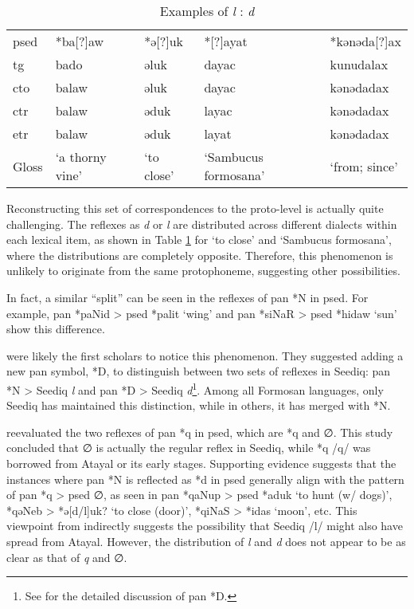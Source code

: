 \begin{table}[!htbp]
\centering
\caption{Examples of \textit{l} : \textit{d}}
\label{tab:irr_ld}
\begin{tabular}{lllll}
\hline
\acs{psed} & *ba[?]aw        & *ə[?]uk    & *[?]ayat             & *kənəda[?]ax    \\ \hdashline
\acs{tg}   & bado            & əluk       & dayac                & kunudalax     \\
\acs{cto}  & balaw           & əluk       & dayac                & kənədadax     \\
\acs{ctr}  & balaw           & əduk       & layac                & kənədadax     \\
\acs{etr}  & balaw           & əduk       & layat                & kənədadax     \\ \hline
Gloss      & `a thorny vine' & `to close' & `Sambucus formosana' & `from; since' \\ \hline
\end{tabular}
\end{table}

Reconstructing this set of correspondences to the proto-level is actually quite challenging. The reflexes as \textit{d} or \textit{l} are distributed across different dialects within each lexical item, as shown in Table \ref{tab:irr_ld} for `to close' and `Sambucus formosana', where the distributions are completely opposite. Therefore, this phenomenon is unlikely to originate from the same protophoneme, suggesting other possibilities.

In fact, a similar ``split'' can be seen in the reflexes of \acl{pan} *N in \acl{psed}. For example, \acs{pan} *paNid > \acs{psed} *palit `wing' and \acs{pan} *siNaR > \acs{psed} *hidaw `sun' show this difference.

\textcite{dyen1987d5} were likely the first scholars to notice this phenomenon. They suggested adding a new \acs{pan} symbol, *D, to distinguish between two sets of reflexes in Seediq: \acs{pan} *N > Seediq \textit{l} and \acs{pan} *D > Seediq \textit{d}\footnote{See \textcite{tsuchida1976tsouic} for the detailed discussion of \acs{pan} *D. }. Among all Formosan languages, only Seediq has maintained this distinction, while in others, it has merged with *N.

\textcite{song2024sedq} reevaluated the two reflexes of \acl{pan} *q in \acl{psed}, which are *q and ∅. This study concluded that ∅ is actually the regular reflex in Seediq, while *q /q/ was borrowed from Atayal or its early stages. Supporting evidence suggests that the instances where \acl{pan} *N is reflected as *d in \acl{psed} generally align with the pattern of \acs{pan} *q > \acs{psed} ∅, as seen in \acs{pan} *qaNup > \acs{psed} *aduk `to hunt (w/ dogs)', *qəNeb > *ə[d/l]uk? `to close (door)', *qiNaS > *idas `moon', etc. This viewpoint from \textcite{song2024sedq} indirectly suggests the possibility that Seediq /l/ might also have spread from Atayal. However, the distribution of \textit{l} and \textit{d} does not appear to be as clear as that of \textit{q} and ∅.

